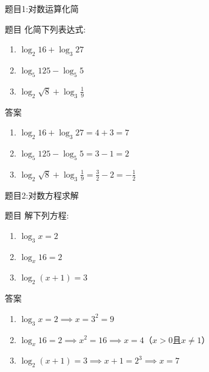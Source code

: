   
  \begin{frame}{题目1:对数运算化简}
    \begin{block}{题目}
        化简下列表达式:
        \begin{enumerate}
            \item $\log_2 16 + \log_3 27$
            \item $\log_5 125 - \log_5 5$
            \item $\log_2 \sqrt{8} + \log_3 \frac{1}{9}$
        \end{enumerate}
    \end{block}
    
    \pause
    
    \begin{block}{答案}
        \begin{enumerate}
            \item $\log_2 16 + \log_3 27 = 4 + 3 = 7$
            \item $\log_5 125 - \log_5 5 = 3 - 1 = 2$
            \item $\log_2 \sqrt{8} + \log_3 \frac{1}{9} = \frac{3}{2} - 2 = -\frac{1}{2}$
        \end{enumerate}
    \end{block}
  \end{frame}
  
  
  
  \begin{frame}{题目2:对数方程求解}
    \begin{block}{题目}
        解下列方程:
        \begin{enumerate}
            \item $\log_3 x = 2$
            \item $\log_x 16 = 2$
            \item $\log_2 (x + 1) = 3$
        \end{enumerate}
    \end{block}
    
    \pause
    
    \begin{block}{答案}
        \begin{enumerate}
            \item $\log_3 x = 2 \implies x = 3^2 = 9$
            \item $\log_x 16 = 2 \implies x^2 = 16 \implies x = 4$（$x > 0$且$x \neq 1$）
            \item $\log_2 (x + 1) = 3 \implies x + 1 = 2^3 \implies x = 7$
        \end{enumerate}
    \end{block}
  \end{frame}
  
